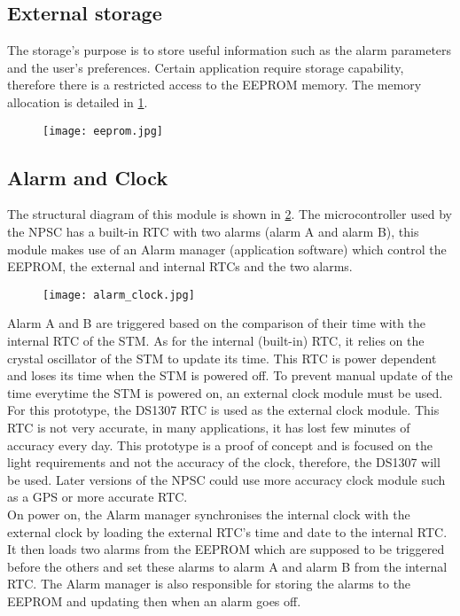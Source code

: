 \subsection{External storage}
The storage's purpose is to store useful information such as the alarm parameters and the user's preferences. Certain application require storage capability, therefore there is a restricted access to the EEPROM memory. The memory allocation is detailed in \cref{fig:eeprom}.
\begin{figure}[ht]
\centering
\texttt{[image: eeprom.jpg]}
\caption{}
\label{fig:eeprom}
\end{figure}

\subsection{Alarm and Clock}
The structural diagram of this module is shown in \cref{fig:alarm_clock}. The microcontroller used by the NPSC has a built-in RTC with two alarms (alarm A and alarm B), this module makes use of an Alarm manager (application software) which control the EEPROM, the external and internal RTCs and the two alarms.
\begin{figure}[ht]
\centering
\texttt{[image: alarm\_clock.jpg]}
\caption{}
\label{fig:alarm_clock}
\end{figure}
Alarm A and B are triggered based on the comparison of their time with the internal RTC of the STM. As for the internal (built-in) RTC, it relies on the crystal oscillator of the STM to update its time. This RTC is power dependent and loses its time when the STM is powered off. To prevent manual update of the time everytime the STM is powered on, an external clock module must be used. For this prototype, the DS1307 RTC is used as the external clock module. This RTC is not very accurate, in many applications, it has lost few minutes of accuracy every day. This prototype is a proof of concept and is focused on the light requirements and not the accuracy of the clock, therefore, the DS1307 will be used. Later versions of the NPSC could use more accuracy clock module such as a GPS or more accurate RTC.  \\
On power on, the Alarm manager synchronises the internal clock with the external clock by loading the external RTC's time and date to the internal RTC. It then loads two alarms from the EEPROM which are supposed to be triggered before the others and set these alarms to alarm A and alarm B from the internal RTC. The Alarm manager is also responsible for storing the alarms to the EEPROM and updating then when an alarm goes off. 

